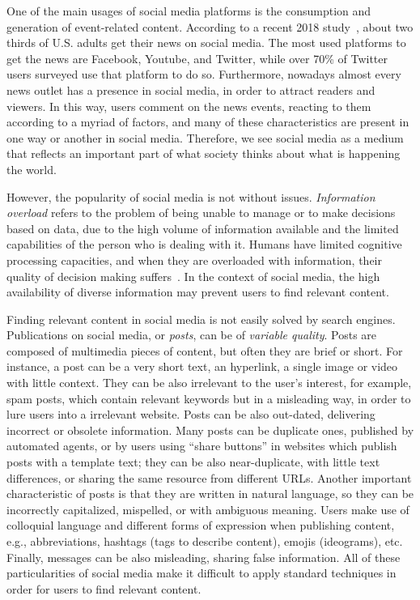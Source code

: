 \begin{intro}


One of the main usages of social media platforms is the consumption and
generation of event-related content. 
%
According to a recent 2018 study~\cite{pewresearch}, about two thirds of U.S.
adults get their news on social media.
%
The most used platforms to get the news are Facebook, Youtube, and Twitter,
while over 70\% of Twitter users surveyed use that platform to do so.
%
Furthermore, nowadays almost every news outlet has a presence in social media,
in order to attract readers and viewers.
%
In this way, users comment on the news events, reacting to them according to a
myriad of factors, and many of these characteristics are present in one way or
another in social media.
%
Therefore, we see social media as a medium that reflects an important 
part of what society thinks about what is happening the world.





However, the popularity of social media is not without issues. 
%
{\em Information overload} refers to the problem of being unable to manage or to
make decisions based on data, due to the high volume of information available
and the limited capabilities of the person who is dealing with it. 
%
Humans have limited cognitive processing capacities, and when they are
overloaded with information, their quality of decision making
suffers~\cite{gross1964managing}. 
%
In the context of social media, the high availability of diverse information may
prevent users to find relevant content.


Finding relevant content in social media is not easily solved by search engines.
%
Publications on social media, or {\em posts}, can be of {\em variable quality}.
%
Posts are composed of multimedia pieces of content, but often they are brief or
short.
%
For instance, a post can be a very short text, an hyperlink, a single image or
video with little context.
%
They can be also irrelevant to the user's interest, for example, spam posts,
which contain relevant keywords but in a misleading way, in order to lure users
into a irrelevant website. 
%
Posts can be also out-dated, delivering incorrect or obsolete information. 
%
Many posts can be duplicate ones, published by automated agents, or by users
using ``share buttons'' in websites which publish posts with a template text; 
%
they can be also near-duplicate, with little text differences, or sharing the
same resource from different URLs.
%
Another important characteristic of posts is that they are written in natural
language, so they can be incorrectly capitalized, mispelled, or with ambiguous
meaning.
%
Users make use of colloquial language and different forms of expression when
publishing content, e.g., abbreviations, hashtags (tags to describe content),
emojis (ideograms), etc.
%
Finally, messages can be also misleading, sharing false information.
%
All of these particularities of social media make it difficult to apply standard
techniques in order for users to find relevant content.


\end{intro}
